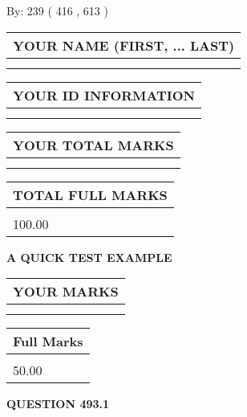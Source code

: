 \documentclass[12pt]{article}
\begin{document}
   
\hspace{1.0in} By: 
 239 ( 416 ,  613 )
   
   
   
   
\newpage 
\setcounter{page}{ 
   493001 } 
   
   
   
   
\noindent\begin{tabular}{|l|}
\hline
YOUR NAME (FIRST, ... LAST)  \\
\hline
 \\ 
 \\ 
\hline
\end{tabular}
\hspace{0.05in} \begin{tabular}{|l|}
\hline
 YOUR   ID   INFORMATION  \\
\hline
 \\ 
 \\ 
\hline
\end{tabular}
   
   
\vspace{0.2in}\noindent\begin{tabular}{|l|}
\hline
YOUR TOTAL MARKS  \\
\hline
 \\ 
 \\ 
\hline
\end{tabular}
\hspace{0.05in} \begin{tabular}{|l|}
\hline
TOTAL FULL MARKS  \\
\hline
 \\ 
100.00 \\
\hline
\end{tabular}
   
   
 \vspace{0.2in}
{\LARGE {\textbf{ A QUICK TEST EXAMPLE}}}
   
   
  
\vspace{0.2in}
  
\noindent\begin{tabular}{|l|}
\hline
 YOUR MARKS  \\
\hline
 \\ 
 \\ 
\hline
\end{tabular}
\hspace{0.05in} \begin{tabular}{|l|}
\hline
 Full Marks  \\
\hline
 \\ 
50.00 \\
\hline
\end{tabular}
{\textbf{\Large{QUESTION
493.1 
}}}
  
\end{document}

